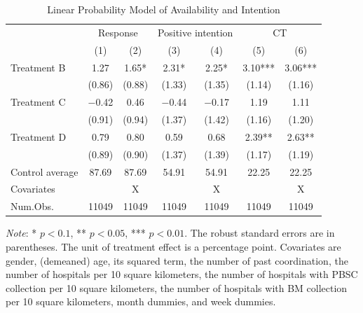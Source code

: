 \documentclass[12pt, a4paper]{article}
\begin{document}
\begin{table}

\caption{\label{tab:stock-reg}Linear Probability Model of Availability and Intention}
\centering
\fontsize{9}{11}\selectfont
\begin{threeparttable}
\begin{tabular}[t]{lcccccc}
\toprule
\multicolumn{1}{c}{ } & \multicolumn{2}{c}{Response} & \multicolumn{2}{c}{Positive intention} & \multicolumn{2}{c}{CT} \\
\cmidrule(l{3pt}r{3pt}){2-3} \cmidrule(l{3pt}r{3pt}){4-5} \cmidrule(l{3pt}r{3pt}){6-7}
  & (1) & (2) & (3) & (4) & (5) & (6)\\
\midrule
Treatment B & \num{1.27} & \num{1.65}* & \num{2.31}* & \num{2.25}* & \num{3.10}*** & \num{3.06}***\\
 & (\num{0.86}) & (\num{0.88}) & (\num{1.33}) & (\num{1.35}) & (\num{1.14}) & (\num{1.16})\\
Treatment C & \num{-0.42} & \num{0.46} & \num{-0.44} & \num{-0.17} & \num{1.19} & \num{1.11}\\
 & (\num{0.91}) & (\num{0.94}) & (\num{1.37}) & (\num{1.42}) & (\num{1.16}) & (\num{1.20})\\
Treatment D & \num{0.79} & \num{0.80} & \num{0.59} & \num{0.68} & \num{2.39}** & \num{2.63}**\\
 & (\num{0.89}) & (\num{0.90}) & (\num{1.37}) & (\num{1.39}) & (\num{1.17}) & (\num{1.19})\\
\midrule
Control average & 87.69 & 87.69 & 54.91 & 54.91 & 22.25 & 22.25\\
Covariates &  & X &  & X &  & X\\
Num.Obs. & \num{11049} & \num{11049} & \num{11049} & \num{11049} & \num{11049} & \num{11049}\\
\bottomrule
\end{tabular}
\begin{tablenotes}
\item \emph{Note}: * $p < 0.1$, ** $p < 0.05$, *** $p < 0.01$. The robust standard errors are in parentheses. The unit of treatment effect is a percentage point. Covariates are gender, (demeaned) age, its squared term, the number of past coordination, the number of hospitals per 10 square kilometers, the number of hospitals with PBSC collection per 10 square kilometers, the number of hospitals with BM collection per 10 square kilometers, month dummies, and week dummies.
\end{tablenotes}
\end{threeparttable}
\end{table}
\end{document}
